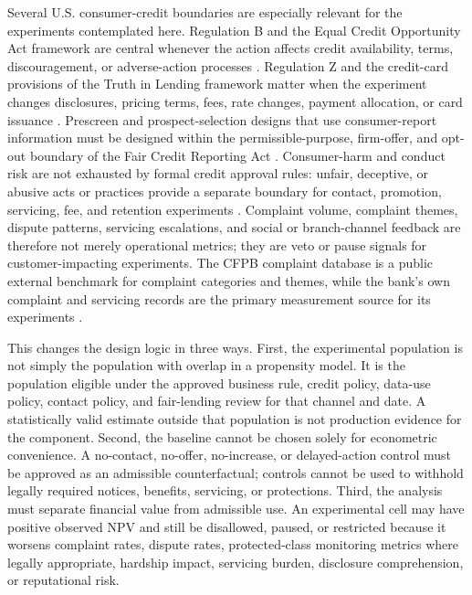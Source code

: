 \documentclass[11pt]{article}
\newcommand{\1}{\mathbf{1}}
\begin{document}
Several U.S. consumer-credit boundaries are especially relevant for the
experiments contemplated here. Regulation B and the Equal Credit Opportunity
Act framework are central whenever the action affects credit availability,
terms, discouragement, or adverse-action processes
\citep{cfpbRegB1002}. Regulation Z and the credit-card provisions of the
Truth in Lending framework matter when the experiment changes disclosures,
pricing terms, fees, rate changes, payment allocation, or card issuance
\citep{cfpbRegZ1026}. Prescreen and prospect-selection designs that use
consumer-report information must be designed within the permissible-purpose,
firm-offer, and opt-out boundary of the Fair Credit Reporting Act
\citep{uscodeFCRA1681b}. Consumer-harm and conduct risk are not exhausted by
formal credit approval rules: unfair, deceptive, or abusive acts or practices
provide a separate boundary for contact, promotion, servicing, fee, and
retention experiments \citep{uscodeUDAAP5531}. Complaint volume, complaint
themes, dispute patterns, servicing escalations, and social or branch-channel
feedback are therefore not merely operational metrics; they are veto or pause
signals for customer-impacting experiments. The CFPB complaint database is a
public external benchmark for complaint categories and themes, while the
bank's own complaint and servicing records are the primary measurement source
for its experiments \citep{cfpbConsumerComplaints}.

This changes the design logic in three ways. First, the experimental
population is not simply the population with overlap in a propensity model. It
is the population eligible under the approved business rule, credit policy,
data-use policy, contact policy, and fair-lending review for that channel and
date. A statistically valid estimate outside that population is not production
evidence for the component. Second, the baseline cannot be chosen solely for
econometric convenience. A no-contact, no-offer, no-increase, or delayed-action
control must be approved as an admissible counterfactual; controls cannot be
used to withhold legally required notices, benefits, servicing, or protections.
Third, the analysis must separate financial value from admissible use. An
experimental cell may have positive observed NPV and still be disallowed,
paused, or restricted because it worsens complaint rates, dispute rates,
protected-class monitoring metrics where legally appropriate, hardship impact,
servicing burden, disclosure comprehension, or reputational risk.
\end{document}
